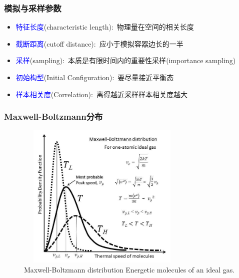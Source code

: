 \frame
{
	\frametitle{模拟与采样参数}
	\begin{itemize}
		\item \textcolor{blue}{特征长度}\textrm{(characteristic length)}:~物理量在空间的相关长度\\
			{\fontsize{8.5pt}{1.2pt}}
		\item \textcolor{blue}{截断距离}\textrm{(cutoff distance)}:~应小于模拟容器边长的一半\\
			{\fontsize{8.5pt}{1.2pt}\selectfont{避免同一粒子与两个镜像同时作用;~截断的处理方式有:~简单截断、截断平移、最小镜像法等三种}}
		\item \textcolor{blue}{采样}\textrm{(sampling)}:~本质是有限时间内的重要性采样\textrm{(importance sampling)}\\
			{\fontsize{8.5pt}{1.2pt}\selectfont{采样对系综平均贡献最大的瞬时量的子集，一般采用均匀时间间隔采样}}
		\item \textcolor{blue}{初始构型}\textrm{(Initial Configuration)}:~要尽量接近平衡态\\
			{\fontsize{8.5pt}{1.2pt}\selectfont{一般需要一定的初始模拟过程使得初始构型达到平衡态，在此初始模拟过程中不采样，需要根据某些参数的变化观察系统是否达到平衡态(液体体积很容易平衡，势能次之，扩散系数较难达到平衡)}}
		\item \textcolor{blue}{样本相关度}\textrm{(Correlation)}:~离得越近采样样本相关度越大\\
			{\fontsize{8.5pt}{1.2pt}\selectfont{相关的样本不影响平均值，但会影响误差范围}}
	\end{itemize}
}

\frame
{
	\frametitle{\textrm{Maxwell-Boltzmann}分布}
\begin{figure}[h!]
\centering
\vspace*{-0.15in}
\includegraphics[height=2.75in,width=3.25in,viewport=0 0 470 460,clip]{Figures/Maxwell-Boltzmann-distribution-Energetic-molecules-of-an-ideal-gas.jpeg}
\caption{\tiny \textrm{Maxwell-Boltzmann distribution Energetic molecules of an ideal gas.}}%
\label{Maxwell-Boltzmann-distribution}
\end{figure}
}

